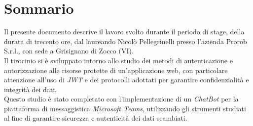 \cleardoublepage
{}
{}
\begingroup
\let\clearpage\relax
\let\cleardoublepage\relax
\let\cleardoublepage\relax

\chapter*{Sommario}

Il presente documento descrive il lavoro svolto durante il periodo di stage, della durata di trecento ore, dal laureando Nicolò Pellegrinelli presso l'azienda Prorob S.r.l., con sede a Grisignano di Zocco (VI).\\
Il tirocinio si è sviluppato intorno allo studio dei metodi di autenticazione e autorizzazione alle risorse protette di un'applicazione web, con particolare attenzione all'uso di \emph{\gls{JWT}} e dei protocolli adottati per garantire confidenzialità e integrità dei dati.\\
Questo studio è stato completato con l'implementazione di un \emph{ChatBot} per la piattaforma di messaggistica \emph{Microsoft Teams}, utilizzando gli strumenti studiati al fine di garantire sicurezza e autenticità dei dati scambiati.\\




\endgroup

\vfill
